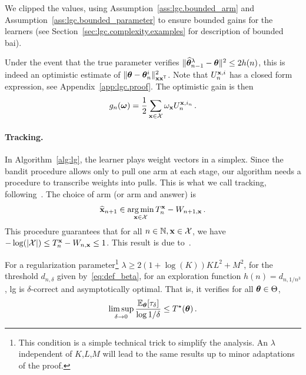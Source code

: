 We clipped the values, using Assumption~\ref{ass:lgc.bounded_arm} and Assumption~\ref{ass:lgc.bounded_parameter} to ensure bounded gains for the learners (see Section~\ref{sec:lgc.complexity.examples} for description of bounded \gls{bai}). 

Under the event that the true parameter verifies $\Vert \widehat{{\boldsymbol \theta}}_{n-1}^\lambda - {\boldsymbol \theta} \Vert^2 \le 2 h(n)$, this is indeed an optimistic estimate of $\Vert {\boldsymbol \theta} - {\boldsymbol \theta}_n^i \Vert^2_{{\bf x}{\bf x}^\mathsf{\scriptscriptstyle T}}$. Note that $U_n^{{\bf x},i}$ has a closed form expression, see Appendix~\ref{app:lgc.proof}. The optimistic gain is then
\[
    g_{n}({\boldsymbol \omega}) = \frac{1}{2}\sum_{{\bf x}\in\mathcal{X}}\omega_{\bf x} U_n^{{\bf x},i_n}\,.
\]


\paragraph{Tracking.} In Algorithm~\ref{alg:lg}, the learner plays weight vectors in a simplex. Since the bandit procedure allows only to pull one arm at each stage, our algorithm needs a procedure to transcribe weights into pulls. This is what we call tracking, following~\citet{garivier2016tracknstop}. The choice of arm (or arm and answer) is
\begin{align*}
    \widehat{{\bf x}}_{n+1} \in \operatorname*{arg\,min}_{{\bf x}\in \mathcal{X} } T_n^{{\bf x}} - W_{n+1,{\bf x}}\,.
\end{align*}
This procedure guarantees that for all $n\in{\mathbb N}, {\bf x}\in\mathcal{X}$, we have $- \log (|\mathcal{X}|) \le T_n^{{\bf x}} - W_{n,{\bf x}} \le 1$. This result is due to~\citet{degenne2020structure}.

\begin{theorem}\label{thm:lgc.sample_complexity}
\begin{leftbar}[theorembar]
For a regularization parameter\footnote{This condition is a simple technical trick to simplify the analysis. An $\lambda$ independent of $K$,$L$,$M$ will lead to the same results up to minor adaptations of the proof.} $\lambda \geq 2(1+\log(K))KL^2+M^2$, for the threshold $d_{n,\delta}$ given by~\eqref{eq:def_beta}, for an exploration function $h(n)=d_{n,1/n^3}$, \gls{lg} is $\delta$-correct and asymptotically optimal. That is, it verifies for all ${\boldsymbol \theta}\in \Theta$,
\begin{align*}
    \limsup_{\delta\to 0}\frac{\mathbb{E}_{\boldsymbol \theta}[\tau_\delta]}{ \log 1/\delta} \le T^{\star}({\boldsymbol \theta}) \,.
\end{align*}
\end{leftbar}
\end{theorem}

